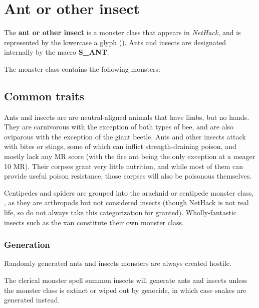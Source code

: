 \chapter{Ant or other insect}
The \textbf{ant or other insect} is a monster class that appears in \textit{NetHack}, and is represented by the lowercase a glyph (\whitesym[a]). Ants and insects are designated internally by the macro \textbf{S\_ANT}.

The monster class contains the following monsters:
\begin{myitemize}
\item{}
\item{}
\item{}
\item{}
\item{}
\item{}
\end{myitemize}

\section{Common traits}
Ants and insects are are neutral-aligned animals that have limbs, but no hands. They are carnivorous with the exception of both types of bee, and are also oviparous with the exception of the giant beetle. Ants and other insects attack with bites or stings, some of which can inflict strength-draining poison, and mostly lack any MR score (with the fire ant being the only exception at a meager 10 MR). Their corpses grant very little nutrition, and while most of them can provide useful poison resistance, those corpses will also be poisonous themselves.

Centipedes and spiders are grouped into the arachnid or centipede monster class, \whitesym[s], as they are arthropods but not considered insects (though NetHack is not real life, so do not always take this categorization for granted). Wholly-fantastic insects such as the xan constitute their own monster class.

\subsection{Generation}
Randomly generated ants and insects monsters are always created hostile.

The clerical monster spell summon insects will generate ants and insects unless the monster class is extinct or wiped out by genocide, in which case snakes are generated instead.

